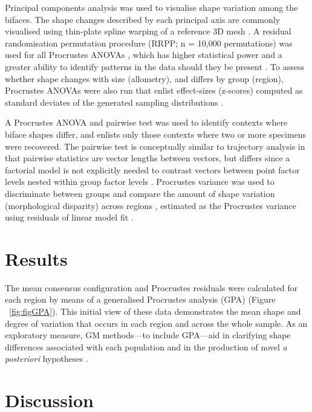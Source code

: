 \documentclass[review]{elsarticle}
\begin{document}
Principal components analysis \citep{RN1746} was used to visualise shape variation among the bifaces. The shape changes described by each principal axis are commonly visualised using thin-plate spline warping of a reference 3D mesh \citep{RN1731,RN479}. A residual randomisation permutation procedure (RRPP; n = 10,000 permutations) was used for all Procrustes ANOVAs \citep{RN1655,RN11775}, which has higher statistical power and a greater ability to identify patterns in the data should they be present \citep{RN1719}. To assess whether shape changes with size (allometry), and differs by group (region), Procrustes ANOVAs \citep{RN1749} were also run that enlist effect-sizes (z-scores) computed as standard deviates of the generated sampling distributions \citep{RN1756}. 

A Procrustes ANOVA and pairwise test was used to identify contexts where biface shapes differ, and enlists only those contexts where two or more specimens were recovered. The pairwise test is conceptually similar to trajectory analysis \citep{RN11573,RN1648,RN1776,RN1739} in that pairwise statistics are vector lengths between vectors, but differs since a factorial model is not explicitly needed to contrast vectors between point factor levels nested within group factor levels \citep{RN11530}. Procrustes variance was used to discriminate between groups and compare the amount of shape variation (morphological disparity) across regions \citep{RN11560}, estimated as the Procrustes variance using residuals of linear model fit \citep{RN11530}.

\section*{Results}

The mean consensus configuration and Procrustes residuals were calculated for each region by means of a generalised Procrustes analysis (GPA) \citep[Figure 3]{RN1720} (Figure ~\ref{fig:figGPA}). This initial view of these data demonstrates the mean shape and degree of variation that occurs in each region and across the whole sample. As an exploratory measure, GM methods---to include GPA---aid in clarifying shape differences associated with each population and in the production of novel \textit{a posteriori} hypotheses \citep{RN1720}.

\section*{Discussion}
\end{document}
